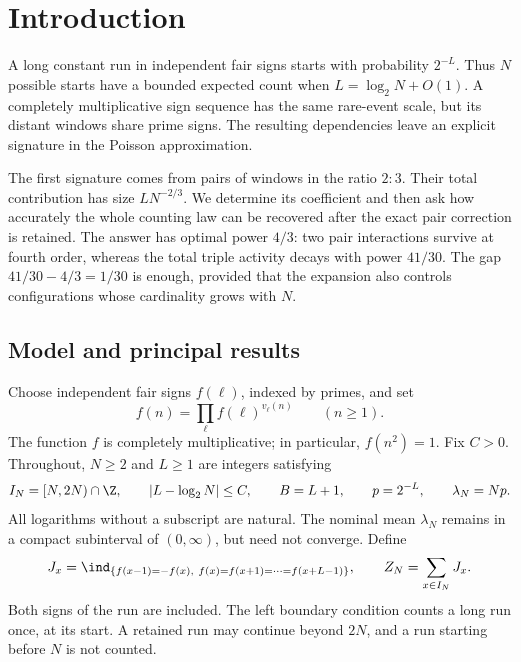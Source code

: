 \section{Introduction}
\label{p1:intro}

A long constant run in independent fair signs starts with probability
\(2^{-L}\). Thus \(N\) possible starts have a bounded expected count
when \(L=\log_2N+O(1)\). A completely multiplicative sign sequence
has the same rare-event scale, but its distant windows share prime
signs. The resulting dependencies leave an explicit signature in the
Poisson approximation.

The first signature comes from pairs of windows in the ratio \(2:3\).
Their total contribution has size \(LN^{-2/3}\). We determine its
coefficient and then ask how accurately the whole counting law can be
recovered after the exact pair correction is retained. The answer has
optimal power \(4/3\): two pair interactions survive at fourth order,
whereas the total triple activity decays with power \(41/30\).
The gap \(41/30-4/3=1/30\) is enough, provided that the expansion
also controls configurations whose cardinality grows with \(N\).

\subsection{Model and principal results}
\label{p1:intro:model}

Choose independent fair signs \(f(\ell)\), indexed by primes, and set
\[
 f(n)=\prod_{\ell}f(\ell)^{v_\ell(n)}\qquad(n\ge1).
\]
The function \(f\) is completely multiplicative; in particular,
\(f(n^2)=1\). Fix \(C>0\). Throughout, \(N\ge2\) and \(L\ge1\)
are integers satisfying
\begin{equation}
 I_N=[N,2N)\cap\Z,\qquad
 |L-\log_2N|\le C,\qquad B=L+1,\qquad
 p=2^{-L},\qquad \lambda_N=Np.
 \label{p1:eq:critical}
\end{equation}
All logarithms without a subscript are natural. The nominal mean
\(\lambda_N\) remains in a compact subinterval of \((0,\infty)\),
but need not converge. Define
\begin{equation}
 J_x=\ind_{\{f(x-1)=-f(x),\
                 f(x)=f(x+1)=\cdots=f(x+L-1)\}},
 \qquad Z_N=\sum_{x\in I_N}J_x.
 \label{p1:eq:model}
\end{equation}
Both signs of the run are included. The left boundary condition counts
a long run once, at its start. A retained run may continue beyond
\(2N\), and a run starting before \(N\) is not counted.

